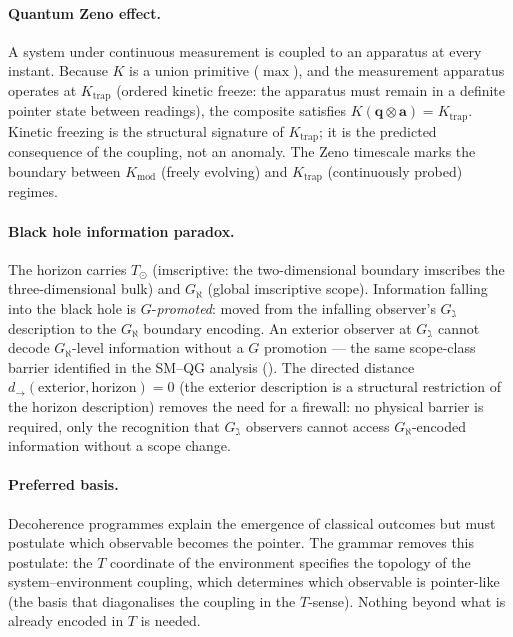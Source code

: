 \documentclass[12pt,a4paper]{article}
\newcommand{\tensor}{\otimes}
\begin{document}
\paragraph{Quantum Zeno effect.}
A system under continuous measurement is coupled to an apparatus at every instant.
Because $K$ is a union primitive ($\max$), and the measurement apparatus operates at
$K_\text{trap}$ (ordered kinetic freeze: the apparatus must remain in a definite
pointer state between readings), the composite satisfies
$K(\mathbf{q} \tensor \mathbf{a}) = K_\text{trap}$.  Kinetic freezing is the
structural signature of $K_\text{trap}$; it is the predicted consequence of the
coupling, not an anomaly.  The Zeno timescale marks the boundary between
$K_\text{mod}$ (freely evolving) and $K_\text{trap}$ (continuously probed) regimes.

\paragraph{Black hole information paradox.}
The horizon carries $T_\odot$ (imscriptive: the two-dimensional boundary imscribes
the three-dimensional bulk) and $G_\aleph$ (global imscriptive scope).  Information
falling into the black hole is $G$-\emph{promoted}: moved from the infalling
observer's $G_\gimel$ description to the $G_\aleph$ boundary encoding.  An exterior
observer at $G_\gimel$ cannot decode $G_\aleph$-level information without a $G$
promotion --- the same scope-class barrier identified in the SM--QG analysis
().  The directed distance $d_\to(\text{exterior}, \text{horizon}) = 0$
(the exterior description is a structural restriction of the horizon description)
removes the need for a firewall: no physical barrier is required, only the recognition
that $G_\gimel$ observers cannot access $G_\aleph$-encoded information without a scope
change.

\paragraph{Preferred basis.}
Decoherence programmes explain the emergence of classical outcomes but must postulate
which observable becomes the pointer.  The grammar removes this postulate: the $T$
coordinate of the environment specifies the topology of the system--environment
coupling, which determines which observable is pointer-like (the basis that
diagonalises the coupling in the $T$-sense).  Nothing beyond what is already encoded
in $T$ is needed.
\end{document}
